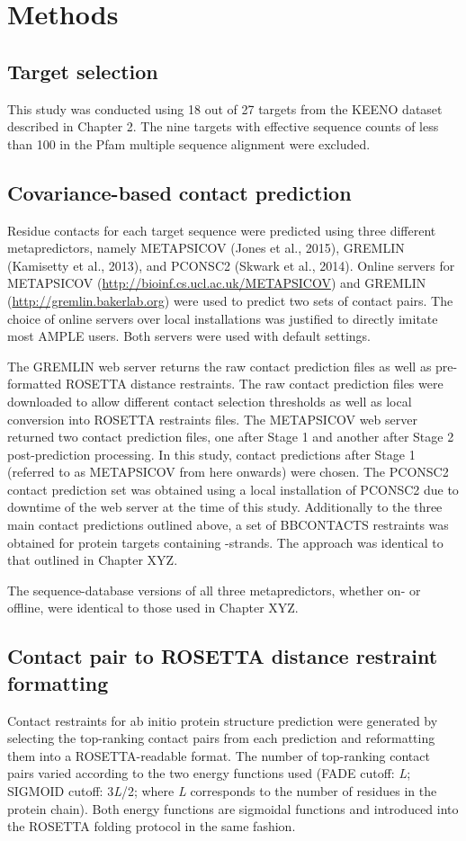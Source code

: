 \section{Methods}
\subsection{Target selection}
This study was conducted using 18 out of 27 targets from the KEENO dataset described in Chapter 2. The nine targets with effective sequence counts of less than 100 in the Pfam multiple sequence alignment were excluded.

\subsection{Covariance-based contact prediction}
Residue contacts for each target sequence were predicted using three different metapredictors, namely METAPSICOV (Jones et al., 2015), GREMLIN (Kamisetty et al., 2013), and PCONSC2 (Skwark et al., 2014). Online servers for METAPSICOV (\url{http://bioinf.cs.ucl.ac.uk/METAPSICOV}) and GREMLIN (\url{http://gremlin.bakerlab.org}) were used to predict two sets of contact pairs. The choice of online servers over local installations was justified to directly imitate most AMPLE users. Both servers were used with default settings.

The GREMLIN web server returns the raw contact prediction files as well as pre-formatted ROSETTA distance restraints. The raw contact prediction files were downloaded to allow different contact selection thresholds as well as local conversion into ROSETTA restraints files. The METAPSICOV web server returned two contact prediction files, one after Stage 1 and another after Stage 2 post-prediction processing. In this study, contact predictions after Stage 1 (referred to as METAPSICOV from here onwards) were chosen. The PCONSC2 contact prediction set was obtained using a local installation of PCONSC2 due to downtime of the web server at the time of this study. Additionally to the three main contact predictions outlined above, a set of BBCONTACTS restraints was obtained for protein targets containing \textbeta-strands. The approach was identical to that outlined in Chapter XYZ.

The sequence-database versions of all three metapredictors, whether on- or offline, were identical to those used in Chapter XYZ.

\subsection{Contact pair to ROSETTA distance restraint formatting}
Contact restraints for ab initio protein structure prediction were generated by selecting the top­-ranking contact pairs from each prediction and reformatting them into a ROSETTA-readable format. The number of top-­ranking contact pairs varied according to the two energy functions used (FADE cutoff: \textit{L}; SIGMOID cutoff: 3\textit{L}/2; where \textit{L} corresponds to the number of residues in the protein chain). Both energy functions are sigmoidal functions and introduced into the ROSETTA folding protocol in the same fashion. 

